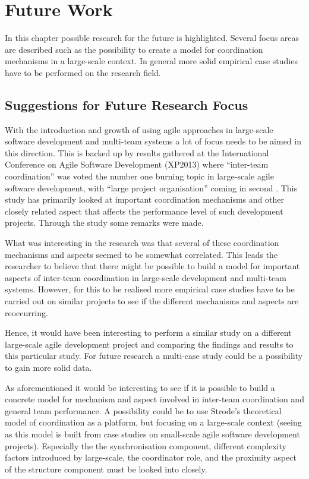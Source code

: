 \chapter{Future Work}


\minitoc

In this chapter possible research for the future is highlighted. Several focus areas are described such as the possibility to create a model for coordination mechanisms in a large-scale context. In general more solid empirical case studies have to be performed on the research field.

\newpage

\section{Suggestions for Future Research Focus}

With the introduction and growth of using agile approaches in large-scale software development and multi-team systems a lot of focus needs to be aimed in this direction. This is backed up by results gathered at the International Conference on Agile Software Development (XP2013) where ``inter-team coordination'' was voted the number one burning topic in large-scale agile software development, with ``large project organisation'' coming in second \cite{Dingsoyr2013b}. This study has primarily looked at important coordination mechanisms and other closely related aspect that affects the performance level of such development projects. Through the study some remarks were made.

What was interesting in the research was that several of these coordination mechanisms and aspects seemed to be somewhat correlated. This leads the researcher to believe that there might be possible to build a model for important aspects of inter-team coordination in large-scale development and multi-team systems. However, for this to be realised more empirical case studies have to be carried out on similar projects to see if the different mechanisms and aspects are reoccurring.

Hence, it would have been interesting to perform a similar study on a different large-scale agile development project and comparing the findings and results to this particular study. For future research a multi-case study could be a possibility to gain more solid data.

As aforementioned it would be interesting to see if it is possible to build a concrete model for mechanism and aspect involved in inter-team coordination and general team performance. A possibility could be to use Strode's theoretical model of coordination as a platform, but focusing on a large-scale context (seeing as this model is built from case studies on small-scale agile software development projects). Especially the the synchronisation component, different complexity factors introduced by large-scale, the coordinator role, and the proximity aspect of the structure component must be looked into closely.

